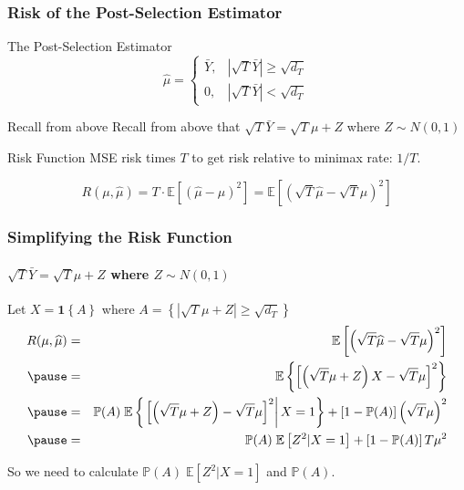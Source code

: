 \begin{frame}
  \frametitle{Risk of the Post-Selection Estimator}
  \begin{block}{The Post-Selection Estimator}
	$$\widehat{\mu}=\left\{\begin{array}
		{cc} \bar{Y}, & |\sqrt{T}\bar{Y} | \geq \sqrt{d_T} \\
		0, & |\sqrt{T}\bar{Y} | < \sqrt{d_T}
		\end{array}\right.$$
  \end{block}

  \pause

  \vspace{-2em}

  \begin{block}{Recall from above}
Recall from above that $\sqrt{T} \bar{Y} = \sqrt{T}\mu +Z$ where $Z\sim N(0,1)$
  \end{block}

  \pause

  \begin{block}{Risk Function}
MSE risk times $T$ to get risk relative to minimax rate: $1/T$.

\[
  R(\mu, \widehat{\mu}) = T \cdot \mathbb{E}\left[\left( \widehat{\mu} - \mu\right)^2\right] = \mathbb{E}\left[\left(\sqrt{T} \widehat{\mu} - \sqrt{T} \mu\right)^2\right] 
\]
  \end{block}
\end{frame}
\begin{frame}
  \frametitle{Simplifying the Risk Function}
  \framesubtitle{$\sqrt{T} \bar{Y} = \sqrt{T}\mu +Z$ where $Z\sim N(0,1)$}

  \footnotesize

  Let $X = \mathbf{1}\left\{ A \right\}$ where $A = \left\{|\sqrt{T}\mu + Z|\geq \sqrt{d_T}  \right\}$ \pause
  \begin{eqnarray*}
    R(\mu, \widehat{\mu}) &=& \mathbb{E}\left[\left(\sqrt{T} \widehat{\mu} - \sqrt{T} \mu\right)^2\right] \\ \pause
  &=& \mathbb{E}\left\{ \left[ \left( \sqrt{T}\mu + Z \right)X - \sqrt{T}\mu \right]^2 \right\}\\ \pause
  &=& \mathbb{P}(A)\; \mathbb{E}\left\{ \left.\left[ \left(\sqrt{T}\mu + Z\right) - \sqrt{T}\mu\right]^2\right| X = 1 \right\} + \left[ 1 - \mathbb{P}(A) \right]\left( \sqrt{T}\mu \right)^2\\ \pause
  &=& \mathbb{P}(A)\; \mathbb{E}
  \left[ Z^2 |X = 1 \right] + \left[ 1 - \mathbb{P}(A) \right]T\mu^2
\end{eqnarray*}

\alert{So we need to calculate $\mathbb{P}(A)\; \mathbb{E}[Z^2|X=1]$ and $\mathbb{P}(A)$.}
\end{frame}
